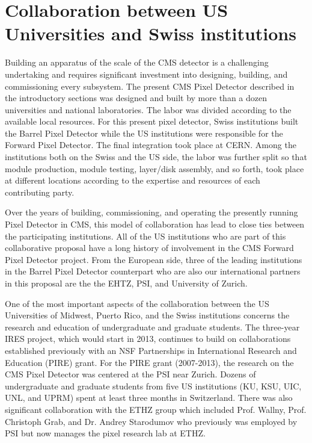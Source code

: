 
\section{Collaboration between US Universities and
Swiss institutions}

Building an apparatus of the scale of the CMS detector is a
challenging undertaking and requires significant investment into
designing, building, and commissioning every subsystem. The present
CMS Pixel Detector described in the introductory sections was designed
and built by more than a dozen universities and national laboratories.
The labor was divided according to the available local resources.  For
this present pixel detector, Swiss institutions built the Barrel Pixel
Detector while the US institutions were responsible for the Forward
Pixel Detector. The final integration took place at CERN. Among the
institutions both on the Swiss and the US side, the labor was further
split so that module production, module testing, layer/disk assembly,
and so forth, took place at different locations according to the
expertise and resources of each contributing party.

Over the years of building, commissioning, and operating the presently
running Pixel Detector in CMS, this model of collaboration has lead to
close ties between the participating institutions. All of the US
institutions who are part of this collaborative proposal have a long
history of involvement in the CMS Forward Pixel Detector project. From
the European side, three of the leading institutions in the Barrel Pixel
Detector counterpart who are also our international partners in this
proposal are the the EHTZ, PSI, and University of Zurich.

One of the most important aspects of the collaboration between the US
Universities of Midwest, Puerto Rico, and the Swiss institutions
concerns the research and education of undergraduate and graduate
students. The three-year IRES project, which would start in 2013,
continues to build on collaborations established previously with an
NSF Partnerships in International Research and Education (PIRE)
grant. For the PIRE grant (2007-2013), the research on the CMS Pixel
Detector was centered at the PSI near Zurich. Dozens of undergraduate
and graduate students from five US institutions (KU, KSU, UIC, UNL,
and UPRM) spent at least three months in Switzerland.  There was also
significant collaboration with the ETHZ group which included
Prof. Wallny, Prof. Christoph Grab, and Dr. Andrey Starodumov who
previously was employed by PSI but now manages the pixel research lab
at ETHZ.

